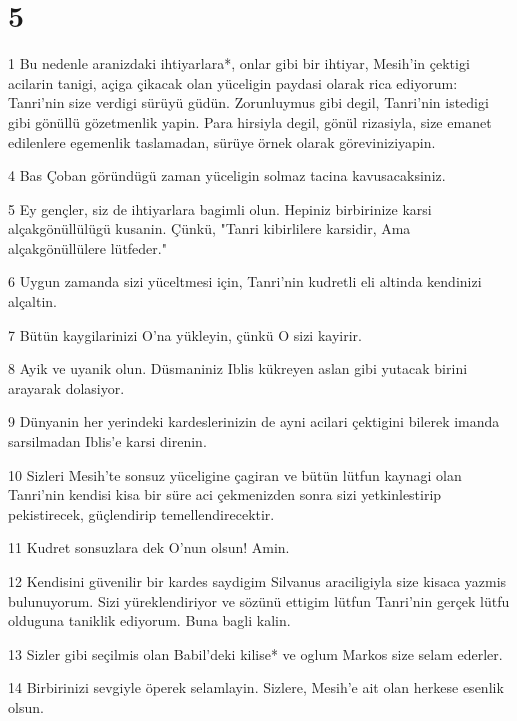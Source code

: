 \chapter{5}

\par 1 Bu nedenle aranizdaki ihtiyarlara*, onlar gibi bir ihtiyar, Mesih'in çektigi acilarin tanigi, açiga çikacak olan yüceligin paydasi olarak rica ediyorum: Tanri'nin size verdigi sürüyü güdün. Zorunluymus gibi degil, Tanri'nin istedigi gibi gönüllü gözetmenlik yapin. Para hirsiyla degil, gönül rizasiyla, size emanet edilenlere egemenlik taslamadan, sürüye örnek olarak göreviniziyapin.
\par 4 Bas Çoban göründügü zaman yüceligin solmaz tacina kavusacaksiniz.
\par 5 Ey gençler, siz de ihtiyarlara bagimli olun. Hepiniz birbirinize karsi alçakgönüllülügü kusanin. Çünkü, "Tanri kibirlilere karsidir, Ama alçakgönüllülere lütfeder."
\par 6 Uygun zamanda sizi yüceltmesi için, Tanri'nin kudretli eli altinda kendinizi alçaltin.
\par 7 Bütün kaygilarinizi O'na yükleyin, çünkü O sizi kayirir.
\par 8 Ayik ve uyanik olun. Düsmaniniz Iblis kükreyen aslan gibi yutacak birini arayarak dolasiyor.
\par 9 Dünyanin her yerindeki kardeslerinizin de ayni acilari çektigini bilerek imanda sarsilmadan Iblis'e karsi direnin.
\par 10 Sizleri Mesih'te sonsuz yüceligine çagiran ve bütün lütfun kaynagi olan Tanri'nin kendisi kisa bir süre aci çekmenizden sonra sizi yetkinlestirip pekistirecek, güçlendirip temellendirecektir.
\par 11 Kudret sonsuzlara dek O'nun olsun! Amin.
\par 12 Kendisini güvenilir bir kardes saydigim Silvanus araciligiyla size kisaca yazmis bulunuyorum. Sizi yüreklendiriyor ve sözünü ettigim lütfun Tanri'nin gerçek lütfu olduguna taniklik ediyorum. Buna bagli kalin.
\par 13 Sizler gibi seçilmis olan Babil'deki kilise* ve oglum Markos size selam ederler.
\par 14 Birbirinizi sevgiyle öperek selamlayin. Sizlere, Mesih'e ait olan herkese esenlik olsun.


